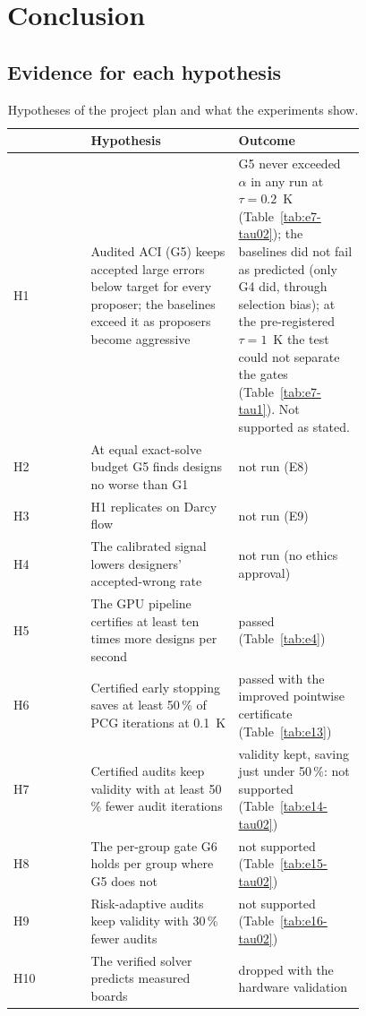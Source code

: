 
\chapter{Conclusion}
\label{ch:conclusion}

\section{Evidence for each hypothesis}
\begin{table}[h]\centering\small
\begin{tabular}{lp{0.42\linewidth}p{0.36\linewidth}}
\hline
& Hypothesis & Outcome \\
\hline
H1 & Audited ACI (G5) keeps accepted large errors below target for every proposer; the baselines
exceed it as proposers become aggressive &
G5 never exceeded $\alpha$ in any run at $\tau = 0.2$~K (Table~\ref{tab:e7-tau02}); the baselines
did not fail as predicted (only G4 did, through selection bias); at the pre-registered $\tau = 1$~K
the test could not separate the gates (Table~\ref{tab:e7-tau1}). Not supported as stated. \\
H2 & At equal exact-solve budget G5 finds designs no worse than G1 & not run (E8) \\
H3 & H1 replicates on Darcy flow & not run (E9) \\
H4 & The calibrated signal lowers designers' accepted-wrong rate & not run (no ethics approval) \\
H5 & The GPU pipeline certifies at least ten times more designs per second &
passed (Table~\ref{tab:e4}) \\
H6 & Certified early stopping saves at least 50\,\% of PCG iterations at 0.1~K &
passed with the improved pointwise certificate (Table~\ref{tab:e13}) \\
H7 & Certified audits keep validity with at least 50\,\% fewer audit iterations &
validity kept, saving just under 50\,\%: not supported (Table~\ref{tab:e14-tau02}) \\
H8 & The per-group gate G6 holds per group where G5 does not & not supported
(Table~\ref{tab:e15-tau02}) \\
H9 & Risk-adaptive audits keep validity with 30\,\% fewer audits & not supported
(Table~\ref{tab:e16-tau02}) \\
H10 & The verified solver predicts measured boards & dropped with the hardware validation \\
\hline
\end{tabular}
\caption{Hypotheses of the project plan and what the experiments show.}
\label{tab:hypotheses}
\end{table}

